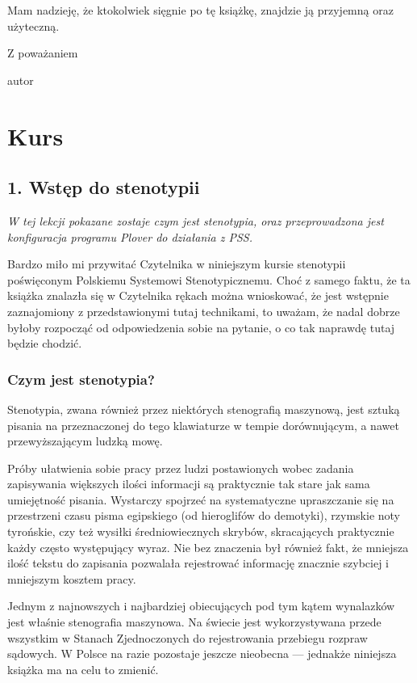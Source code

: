\documentclass[12p, oneside]{book}
\begin{document}
Mam nadzieję, że ktokolwiek sięgnie po tę książkę, znajdzie ją przyjemną oraz
użyteczną.

Z poważaniem

autor

\chapter{Kurs}

\section{1. Wstęp do stenotypii}

\textit{W tej lekcji pokazane zostaje czym jest stenotypia, oraz przeprowadzona jest konfiguracja programu Plover do działania z PSS.}

Bardzo miło mi przywitać Czytelnika w niniejszym kursie stenotypii poświęconym Polskiemu Systemowi Stenotypicznemu. Choć z samego faktu, że ta książka znalazła się w Czytelnika rękach można wnioskować, że jest wstępnie zaznajomiony z przedstawionymi tutaj technikami, to uważam, że nadal dobrze byłoby rozpocząć od odpowiedzenia sobie na pytanie, o co tak naprawdę tutaj będzie chodzić.

\subsection*{Czym jest stenotypia?}

Stenotypia, zwana również przez niektórych stenografią maszynową, jest sztuką pisania na przeznaczonej do tego klawiaturze w tempie dorównującym, a nawet przewyższającym ludzką mowę.

Próby ułatwienia sobie pracy przez ludzi postawionych wobec zadania zapisywania większych ilości informacji są praktycznie tak stare jak sama umiejętność pisania. Wystarczy spojrzeć na systematyczne upraszczanie się na przestrzeni czasu pisma egipskiego (od hieroglifów do demotyki), rzymskie noty tyrońskie, czy też wysiłki średniowiecznych skrybów, skracających praktycznie każdy często występujący wyraz. Nie bez znaczenia był również fakt, że mniejsza ilość tekstu do zapisania pozwalała rejestrować informację znacznie szybciej i mniejszym kosztem pracy.

Jednym z najnowszych i najbardziej obiecujących pod tym kątem wynalazków jest właśnie stenografia maszynowa. Na świecie jest wykorzystywana przede wszystkim w Stanach Zjednoczonych do rejestrowania przebiegu rozpraw sądowych. W Polsce na razie pozostaje jeszcze nieobecna --- jednakże niniejsza książka ma na celu to zmienić.
\end{document}
